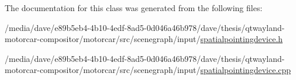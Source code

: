 The documentation for this class was generated from the following files\-:\begin{DoxyCompactItemize}
\item 
/media/dave/e89b5eb4-\/4b10-\/4edf-\/8ad5-\/0d046a46b978/dave/thesis/qtwayland-\/motorcar-\/compositor/motorcar/src/scenegraph/input/\hyperlink{spatialpointingdevice_8h}{spatialpointingdevice.\-h}\item 
/media/dave/e89b5eb4-\/4b10-\/4edf-\/8ad5-\/0d046a46b978/dave/thesis/qtwayland-\/motorcar-\/compositor/motorcar/src/scenegraph/input/\hyperlink{spatialpointingdevice_8cpp}{spatialpointingdevice.\-cpp}\end{DoxyCompactItemize}
